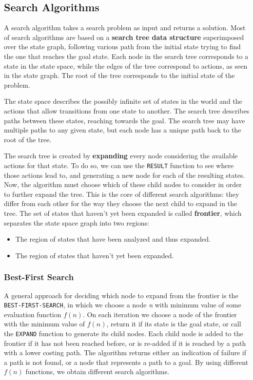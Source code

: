 \documentclass{article}
\newcommand{\code}{\lstinline}
\begin{document}
\subsection{Search Algorithms}
A search algorithm takes a search problem as input and returns a solution. Most of search algorithms are based on a \textbf{search tree data structure} superimposed over the state graph, following various path from the initial state trying to find the one that reaches the goal state. Each node in the search tree corresponds to a state in the state space, while the edges of the tree correspond to actions, as seen in the state graph. The root of the tree corresponds to the initial state of the problem. 

The state space describes the possibly infinite set of states in the world and the actions that allow transitions from one state to another. The search tree describes paths between these states, reaching towards the goal. The search tree may have multiple paths to any given state, but each node has a unique path back to the root of the tree. 

The search tree is created by \textbf{expanding} every node considering the available actions for that state. To do so, we can use the \code{RESULT} function to see where those actions lead to, and generating a new node for each of the resulting states. Now, the algorithm must choose which of these child nodes to consider in order to further expand the tree. This is the core of different search algorithms: they differ from each other for the way they choose the next child to expand in the tree. The set of states that haven't yet been expanded is called \textbf{frontier}, which separates the state space graph into two regions:
\begin{itemize}
    \item The region of states that have been analyzed and thus expanded.
    \item The region of states that haven't yet been expanded.
\end{itemize}

\subsubsection{Best-First Search}
A general approach for deciding which node to expand from the frontier is the \code{BEST-FIRST-SEARCH}, in which we choose a node \textit{n} with minimum value of some evaluation function $f(n)$. On each iteration we choose a node of the frontier with the minimum value of $f(n)$, return it if its state is the goal state, or call the \code{EXPAND} function to generate its child nodes. Each child node is added to the frontier if it has not been reached before, or is re-added if it is reached by a path with a lower costing path. The algorithm returns either an indication of failure if a path is not found, or a node that represents a path to a goal. By using different $f(n)$ functions, we obtain different search algorithms.
\end{document}
